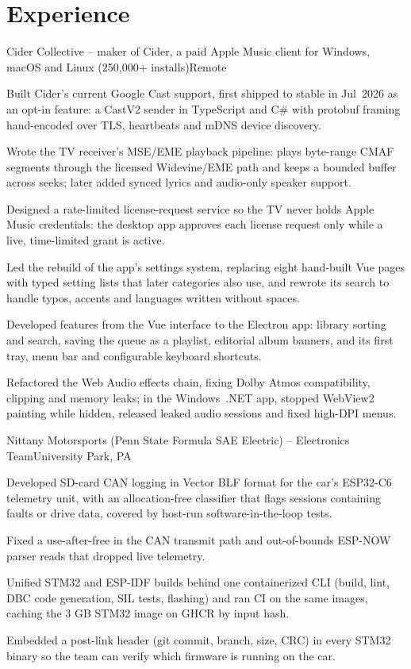 \section{Experience}
      {Cider Collective -- maker of Cider, a paid Apple Music client for Windows, macOS and Linux (250,000+ installs)}{Remote}
\begin{bullets}
  \item Built Cider's current Google Cast support, first shipped to stable in Jul~2026 as an opt-in feature: a CastV2 sender in TypeScript
        and C\# with protobuf framing hand-encoded over TLS, heartbeats and mDNS device discovery.
  \item Wrote the TV receiver's MSE/EME playback pipeline: plays byte-range CMAF segments through the licensed
        Widevine/EME path and keeps a bounded buffer across seeks; later added synced lyrics and audio-only speaker support.
  \item Designed a rate-limited license-request service so the TV never holds Apple Music credentials: the desktop app
        approves each license request only while a live, time-limited grant is active.
  \item Led the rebuild of the app's settings system, replacing eight hand-built Vue pages with typed setting lists that later
        categories also use, and rewrote its search to handle typos, accents and languages written without spaces.
  \item Developed features from the Vue interface to the Electron app: library sorting and search, saving the queue as a playlist,
        editorial album banners, and its first tray, menu bar and configurable keyboard shortcuts.
  \item Refactored the Web Audio effects chain, fixing Dolby Atmos compatibility, clipping and memory leaks; in the
        Windows~.NET app, stopped WebView2 painting while hidden, released leaked audio sessions and fixed high-DPI menus.
\end{bullets}

      {Nittany Motorsports (Penn State Formula SAE Electric) -- Electronics Team}{University Park, PA}
\begin{bullets}
  \item Developed SD-card CAN logging in Vector BLF format for the car's ESP32-C6 telemetry unit, with an allocation-free
        classifier that flags sessions containing faults or drive data, covered by host-run software-in-the-loop tests.
  \item Fixed a use-after-free in the CAN transmit path and out-of-bounds ESP-NOW parser reads that dropped live telemetry.
  \item Unified STM32 and ESP-IDF builds behind one containerized CLI (build, lint, DBC code generation, SIL tests, flashing)
        and ran CI on the same images, caching the 3 GB STM32 image on GHCR by input hash.
  \item Embedded a post-link header (git commit, branch, size, CRC) in every STM32 binary so the team can verify which
        firmware is running on the car.
\end{bullets}

